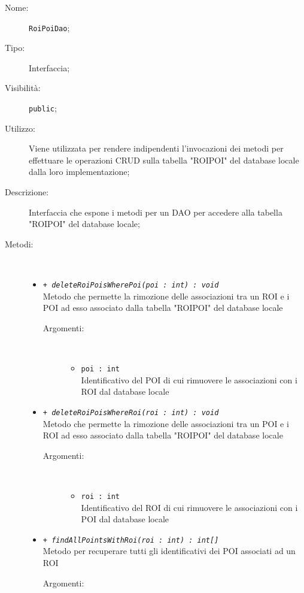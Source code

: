 \documentclass[../DefinizioneDiProdotto.tex]{subfiles}
\begin{document}
    \begin{description}
\item[Nome:] \texttt{RoiPoiDao};
\item[Tipo:] Interfaccia;
\item[Visibilità:] \texttt{public};
\item[Utilizzo:] Viene utilizzata per rendere indipendenti l'invocazioni dei metodi per effettuare le operazioni CRUD sulla tabella "ROIPOI" del database locale dalla loro implementazione;
\item[Descrizione:] Interfaccia che espone i metodi per un DAO per accedere alla tabella "ROIPOI" del database locale;
\item[Metodi:] \
\begin{itemize}
\item \texttt{+ \textit{deleteRoiPoisWherePoi(poi : int) : void}}\\
Metodo che permette la rimozione delle associazioni tra un ROI e i POI ad esso associato dalla tabella "ROIPOI" del database locale 
 \begin{description}
\item[Argomenti:] \
\begin{itemize}
\item \texttt{poi : int}\\
Identificativo del POI di cui rimuovere le associazioni con i ROI dal database locale\end{itemize}
\end{description}
\item \texttt{+ \textit{deleteRoiPoisWhereRoi(roi : int) : void}}\\
Metodo che permette la rimozione delle associazioni tra un POI e i ROI ad esso associato dalla tabella "ROIPOI" del database locale 
 \begin{description}
\item[Argomenti:] \
\begin{itemize}
\item \texttt{roi : int}\\
Identificativo del ROI di cui rimuovere le associazioni con i POI dal database locale\end{itemize}
\end{description}
\item \texttt{+ \textit{findAllPointsWithRoi(roi : int) : int[]}}\\
Metodo per recuperare tutti gli identificativi dei POI associati ad un ROI 
 \begin{description}
\item[Argomenti:] \

\end{description}
\end{itemize}
\end{description}
\end{document}
